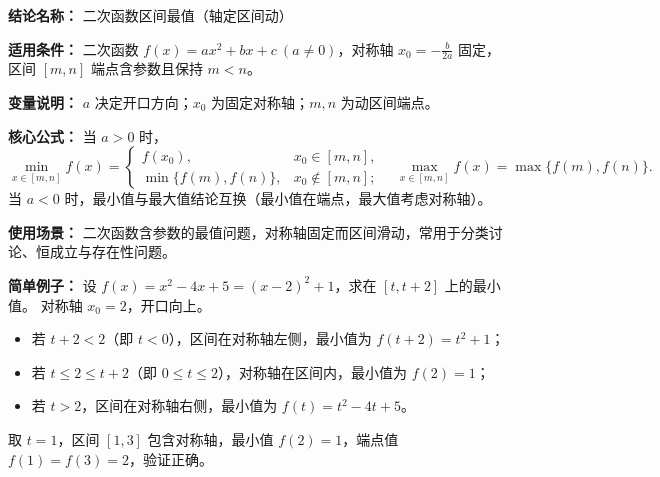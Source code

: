 \textbf{结论名称：} 二次函数区间最值（轴定区间动）

\textbf{适用条件：} 二次函数 $f(x)=ax^2+bx+c\ (a\neq 0)$，对称轴 $x_0=-\frac{b}{2a}$ 固定，区间 $[m,n]$ 端点含参数且保持 $m<n$。

\textbf{变量说明：} $a$ 决定开口方向；$x_0$ 为固定对称轴；$m,n$ 为动区间端点。

\textbf{核心公式：}
当 $a>0$ 时，
\[
\boxed{
\min_{x\in[m,n]} f(x)=
\begin{cases}
f(x_0), & x_0\in[m,n],\\[2pt]
\min\{f(m),f(n)\}, & x_0\notin[m,n];
\end{cases}
\quad
\max_{x\in[m,n]} f(x)=\max\{f(m),f(n)\}.
}
\]
当 $a<0$ 时，最小值与最大值结论互换（最小值在端点，最大值考虑对称轴）。

\textbf{使用场景：} 二次函数含参数的最值问题，对称轴固定而区间滑动，常用于分类讨论、恒成立与存在性问题。

\textbf{简单例子：}
设 $f(x)=x^2-4x+5=(x-2)^2+1$，求在 $[t,t+2]$ 上的最小值。
对称轴 $x_0=2$，开口向上。
\begin{itemize}
\item 若 $t+2<2$（即 $t<0$），区间在对称轴左侧，最小值为 $f(t+2)=t^2+1$；
\item 若 $t\leq 2\leq t+2$（即 $0\leq t\leq 2$），对称轴在区间内，最小值为 $f(2)=1$；
\item 若 $t>2$，区间在对称轴右侧，最小值为 $f(t)=t^2-4t+5$。
\end{itemize}
取 $t=1$，区间 $[1,3]$ 包含对称轴，最小值 $f(2)=1$，端点值 $f(1)=f(3)=2$，验证正确。